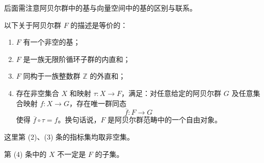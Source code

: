 \begin{purplenote}
后面需注意阿贝尔群中的基与向量空间中的基的区别与联系。
\end{purplenote}

\begin{theorem}\label{thm:free-abelian-characterizations}
以下关于阿贝尔群 $F$ 的描述是等价的：
\begin{enumerate}[label=(\arabic*)]
  \item $F$ 有一个非空的基；
  \item $F$ 是一族无限阶循环子群的内直和；
  \item $F$ 同构于一族整数群 $\mathbb Z$ 的外直和；
  \item 存在非空集合 $X$ 和映射 $\tau:X\to F$，满足：对任意给定的阿贝尔群 $G$ 及任意集合映射 $f:X\to G$，存在唯一群同态
  \[
    \overline f:F\longrightarrow G
  \]
  使得 $\overline f\circ\tau=f$。换句话说，$F$ 是阿贝尔群范畴中的一个自由对象。
\end{enumerate}
这里第 (2)、(3) 条的指标集均取非空集。
\end{theorem}

\begin{purplenote}
第 (4) 条中的 $X$ 不一定是 $F$ 的子集。
\end{purplenote}

